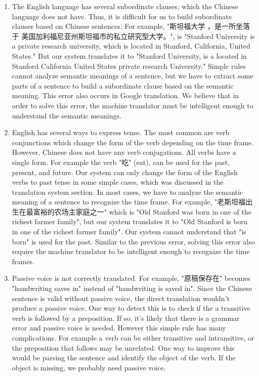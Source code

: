 \documentclass[11pt]{article} %
\begin{document}
\begin{CJK}{UTF8}{gbsn}
\begin{enumerate}
\item The English language has several subordinate clauses, which the Chinese language does not have. Thus, it is difficult for us to build subordinate clauses based on Chinese sentences. For example, "斯坦福大学 ，是一所坐落于 美国加利福尼亚州斯坦福市的私立研究型大学。", is "Stanford University is a private research university, which is located in Stanford, California, United States." But our system translates it to "Stanford University, is a located in Stanford California United States private research University." Simple rules cannot analyze semantic meanings of a sentence, but we have to extract some parts of a sentence to build a subordinate clause based on the semantic meaning. This error also occurs in Google translation. We believe that in order to solve this error, the machine translator must be intelligent enough to understand the semantic meanings.

\item English has several ways to express tense. The most common are verb conjunctions which change the form of the verb depending on the time frame. However, Chinese does not have any verb conjugations. All verbs have a single form. For example the verb "吃" (eat), can be used for the past, present, and future. Our system can only change the form of the English verbs to past tense in some simple cases, which was discussed in the translation system section. In most cases, we have to analyze the semantic meaning of a sentence to recognize the time frame. For example, "老斯坦福出生在最富裕的农场主家庭之一" which is "Old Stanford was born in one of the richest farmer family", but our system translates it to "Old Stanford is born in one of the richest farmer family". Our system cannot understand that "is born" is used for the past. Similar to the previous error, solving this error also require the machine translator to be intelligent enough to recognize the time frames.


\item Passive voice is not correctly translated. For example, "原稿保存在" becomes "handwriting saves in" instead of "handwriting is saved in". Since the Chinese sentence is valid without passive voice, the direct translation wouldn't produce a passive voice. One way to detect this is to check if the a transitive verb is followed by a preposition. If so, it's likely that there is a grammar error and passive voice is needed. However this simple rule has many complications. For example a verb can be either transitive and intransitive, or the preposition that follows may be unrelated. One way to improve this would be parsing the sentence and identify the object of the verb. If the object is missing, we probably need passive voice.


\end{enumerate}
\end{CJK}
\end{document}
